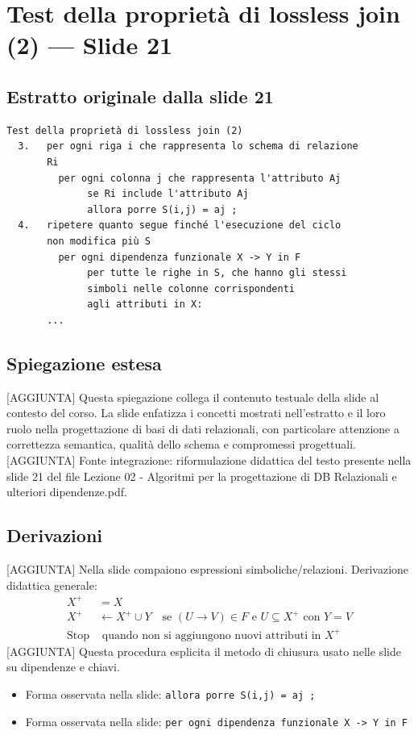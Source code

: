 \documentclass[11pt]{article}
\begin{document}
\section{Test della proprietà di lossless join (2) --- Slide 21}
\subsection*{Estratto originale dalla slide 21}
\begin{lstlisting}
Test della proprietà di lossless join (2)
  3.   per ogni riga i che rappresenta lo schema di relazione
       Ri
         per ogni colonna j che rappresenta l'attributo Aj
              se Ri include l'attributo Aj
              allora porre S(i,j) = aj ;
  4.   ripetere quanto segue finché l'esecuzione del ciclo
       non modifica più S
         per ogni dipendenza funzionale X -> Y in F
              per tutte le righe in S, che hanno gli stessi
              simboli nelle colonne corrispondenti
              agli attributi in X:
       ...
\end{lstlisting}
\subsection*{Spiegazione estesa}
[AGGIUNTA] Questa spiegazione collega il contenuto testuale della slide al contesto del corso. La slide enfatizza i concetti mostrati nell'estratto e il loro ruolo nella progettazione di basi di dati relazionali, con particolare attenzione a correttezza semantica, qualità dello schema e compromessi progettuali.
[AGGIUNTA] Fonte integrazione: riformulazione didattica del testo presente nella slide 21 del file Lezione 02 - Algoritmi per la progettazione di DB Relazionali e ulteriori dipendenze.pdf.
\subsection*{Derivazioni}
[AGGIUNTA] Nella slide compaiono espressioni simboliche/relazioni. Derivazione didattica generale:
\begin{align*}
X^+ &= X \\
X^+ &\leftarrow X^+ \cup Y \quad \text{se } (U \to V) \in F \text{ e } U \subseteq X^+ \text{ con } Y=V \\
\text{Stop} &\text{ quando non si aggiungono nuovi attributi in } X^+
\end{align*}
[AGGIUNTA] Questa procedura esplicita il metodo di chiusura usato nelle slide su dipendenze e chiavi.
\begin{itemize}[leftmargin=*]
\item Forma osservata nella slide: \texttt{allora porre S(i,j) = aj ;}
\item Forma osservata nella slide: \texttt{per ogni dipendenza funzionale X -> Y in F}
\end{itemize}
\end{document}
